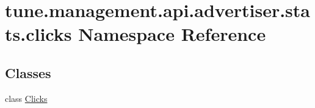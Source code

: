 \hypertarget{namespacetune_1_1management_1_1api_1_1advertiser_1_1stats_1_1clicks}{\section{tune.\-management.\-api.\-advertiser.\-stats.\-clicks Namespace Reference}
\label{namespacetune_1_1management_1_1api_1_1advertiser_1_1stats_1_1clicks}
}
\subsection*{Classes}
\begin{DoxyCompactItemize}
\item 
class \hyperlink{classtune_1_1management_1_1api_1_1advertiser_1_1stats_1_1clicks_1_1Clicks}{Clicks}
\end{DoxyCompactItemize}
